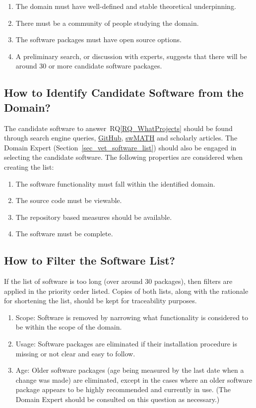 \documentclass[runningheads]{llncs}
\newcommand{\rqref}[1]{RQ\ref{#1}}
\begin{document}
\begin{enumerate}
\item The domain must have well-defined and stable theoretical underpinning.
\item There must be a community of people studying the domain.
\item The software packages must have open source options.
\item A preliminary search, or discussion with experts, suggests that there will
  be around 30 or more candidate software packages.
\end{enumerate}	

\subsection{How to Identify Candidate Software from the Domain?}
\label{identifysoftware}

The candidate software to answer~\rqref{RQ_WhatProjects} should be found through
search engine queries,  
\href{https://github.com/} {GitHub}, \href{https://swmath.org/} {swMATH}
and scholarly articles. The Domain Expert (Section~\ref{sec_vet_software_list})
should also be engaged in selecting the candidate software.  The following
properties are considered when creating the list:

\begin{enumerate}
	\item The software functionality must fall within the identified domain.
	\item The source code must be viewable.
	\item The repository based measures should be available.
	\item The software must be complete.
\end{enumerate}

\subsection{How to Filter the Software List?} \label{filtersoftware}

If the list of software is too long (over around 30 packages), then filters are
applied in the priority order listed. Copies of both lists, along with the
rationale for shortening the list, should be kept for traceability purposes.

\begin{enumerate}
	\item Scope: Software is removed by narrowing what functionality is
	considered to be within the scope of the domain.
	\item Usage: Software packages are eliminated if their installation
	procedure is missing or not clear and easy to follow.
	\item Age: Older software packages (age being measured by the last date
	when a change was made) are eliminated, except in the cases where an older
	software package appears to be highly recommended and currently in use. (The
	Domain Expert should be consulted on this question as necessary.)
\end{enumerate}
\end{document}

